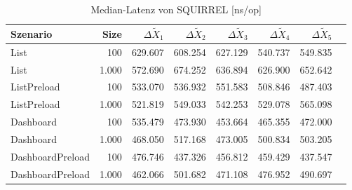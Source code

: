 
\begin{table}[ht]
\setlength{\extrarowheight}{-1pt}
\centering
\caption{Median-Latenz von SQUIRREL [ns/op]}
\begin{tabular}{lrrrrrrr}
\toprule
Szenario & Size & ${\Delta \tilde{X}_1}$ & ${\Delta \tilde{X}_2}$ & ${\Delta \tilde{X}_3}$ & ${\Delta \tilde{X}_4}$ & ${\Delta \tilde{X}_5}$ \\
\midrule
	List & 100 & \cellcolor{red!50}  629.607 & \cellcolor{red!50}  608.254 & \cellcolor{red!50}  627.129 & \cellcolor{red!50}  540.737 & \cellcolor{red!50}  549.835 \\
	List & 1.000 & \cellcolor{red!50}  572.690 & \cellcolor{red!50}  674.252 & \cellcolor{red!50}  636.894 & \cellcolor{red!50}  626.900 & \cellcolor{red!50}  652.642 \\
	ListPreload & 100 & \cellcolor{red!50}  533.070 & \cellcolor{red!50}  536.932 & \cellcolor{red!50}  551.583 & \cellcolor{red!50}  508.846 & \cellcolor{red!46}  487.403 \\
	ListPreload & 1.000 & \cellcolor{red!50}  521.819 & \cellcolor{red!50}  549.033 & \cellcolor{red!50}  542.253 & \cellcolor{red!50}  529.078 & \cellcolor{red!50}  565.098 \\
	Dashboard & 100 & \cellcolor{red!50}  535.479 & \cellcolor{red!50}  473.930 & \cellcolor{red!46}  453.664 & \cellcolor{red!50}  465.355 & \cellcolor{red!50}  472.000 \\
	Dashboard & 1.000 & \cellcolor{red!41}  468.050 & \cellcolor{red!50}  517.168 & \cellcolor{red!50}  473.005 & \cellcolor{red!50}  500.834 & \cellcolor{red!43}  503.205 \\
	DashboardPreload & 100 & \cellcolor{red!48}  476.746 & \cellcolor{red!38}  437.326 & \cellcolor{red!45}  456.812 & \cellcolor{red!41}  459.429 & \cellcolor{red!37}  437.547 \\
	DashboardPreload & 1.000 & \cellcolor{red!37}  462.066 & \cellcolor{red!47}  501.682 & \cellcolor{red!47}  471.108 & \cellcolor{red!45}  476.952 & \cellcolor{red!42}  490.697 \\
\bottomrule
\end{tabular}
\label{tab:latenz_squirrel}
\end{table}
	